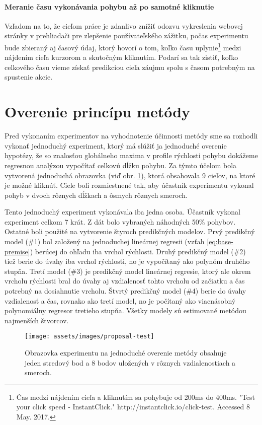 \paragraph{Meranie času vykonávania pohybu až po samotné kliknutie}
Vzľadom na to, že cieľom práce je zdanlivo znížiť odozvu vykreslenia webovej stránky v prehliadači pre zlepšenie používateľského zážitku, počas experimentu bude zbieraný aj časový údaj, ktorý hovorí o tom, koľko času uplynie\footnote{Čas medzi nájdením cieľa a kliknutím sa pohybuje od 200ms do 400ms. "Test your click speed - InstantClick." http://instantclick.io/click-test. Accessed 8 May. 2017.} medzi nájdením cieľa kurzorom a skutočným kliknutím. Podarí sa tak zistiť, koľko celkového času vieme získať predikciou cieľa záujmu spolu s časom potrebným na spustenie akcie.

\section{Overenie princípu metódy \label{sec:exp-verify}}
Pred vykonaním experimentov na vyhodnotenie účinnosti metódy sme sa rozhodli vykonať jednoduchý experiment, ktorý má slúžiť ja jednoduché overenie hypotézy, že so znalosťou globálneho maxima v profile rýchlosti pohybu dokážeme regresnou analýzou vypočítať celkovú dĺžku pohybu. Za týmto účelom bola vytvorená jednoduchá obrazovka (viď obr. \ref{fig:proposal-test}), ktorá obsahovala 9 cieľov, na ktoré je možné kliknúť. Ciele boli rozmiestnené tak, aby účastník experimentu vykonal pohyb v dvoch rôznych dĺžkach a ôsmych rôznych smeroch.

Tento jednoduchý experiment vykonávala iba jedna osoba. Účastník vykonal experiment celkom 7 krát. Z dát bolo vybraných náhodných 50\% pohybov. Ostatné boli použité na vytvorenie štyroch predikčných modelov. Prvý predikčný model (\#1) bol založený na jednoduchej lineárnej regresii (vzťah \ref{eq:base-premise}) berúcej do ohľadu iba vrchol rýchlosti. Druhý predikčný model (\#2) tiež berie do úvahy iba vrchol rýchlosti, no je vypočítaný ako polynóm druhého stupňa. Tretí model (\#3) je predikčný model lineárnej regresie, ktorý ale okrem vrcholu rýchlosti bral do úvahy aj vzdialenosť tohto vrcholu od začiatku a čas potrebný na dosiahnutie vrcholu. Štvrtý predikčný model (\#4) berie do úvahy vzdialenosť a čas, rovnako ako tretí model, no je počítaný ako viacnásobný polynomiálny regresor tretieho stupňa. Všetky modely sú estimované metódou najmenších štvorcov.

\begin{figure}[h]
\centering
\texttt{[image: assets/images/proposal-test]}
\caption{Obrazovka experimentu na jednoduché overenie metódy obsahuje jeden stredový bod a 8 bodov uložených v rôznych vzdialenostiach a smeroch. \label{fig:proposal-test}}
\end{figure}

